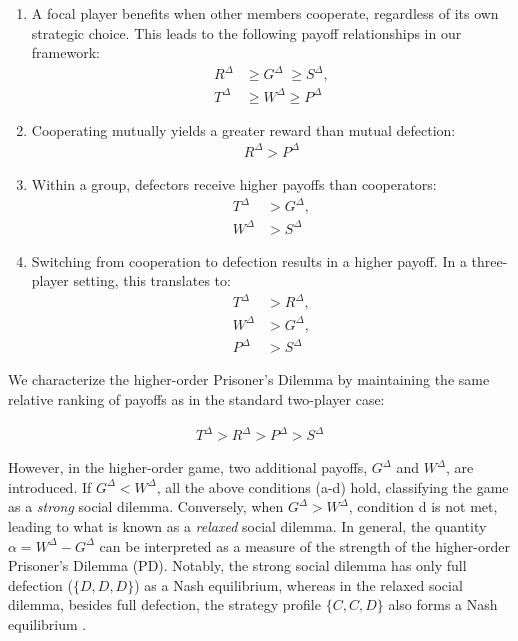 \documentclass[a4paper,pre,reqno,superscriptaddress,twocolumn, floatfix]{revtex4}
\begin{document}
\begin{enumerate}[label=\alph*.]
    \item A focal player benefits when other members cooperate, regardless of its own strategic choice. This leads to the following payoff relationships in our framework:
    \begin{align}
        R^{\Delta} &\geq G^{\Delta} \;\geq S^{\Delta}, \\
        T^{\Delta} &\geq W^{\Delta} \geq P^{\Delta}
    \end{align}
    \item Cooperating mutually yields a greater reward than mutual defection:
    \begin{align}
        R^{\Delta} > P^{\Delta}
    \end{align}
    \item Within a group, defectors receive higher payoffs than cooperators:
    \begin{align}
        T^{\Delta} &> G^{\Delta}, \\
        W^{\Delta} &> S^{\Delta}
    \end{align}
    \item Switching from cooperation to defection results in a higher payoff. In a three-player setting, this translates to:
    \begin{align}
        T^{\Delta} &> R^{\Delta}, \\
        W^{\Delta} &> G^{\Delta}, \\
        P^{\Delta} &> S^{\Delta}
    \end{align}
\end{enumerate}


We characterize the higher-order Prisoner's Dilemma by maintaining the same relative ranking of payoffs as in the standard two-player case:

\begin{align}
    T^{\Delta}>R^{\Delta}>P^{\Delta}>S^{\Delta}
\end{align}

However, in the higher-order game, two additional payoffs, $G^{\Delta}$ and $W^{\Delta}$, are introduced. If $G^{\Delta} < W^{\Delta}$, all the above conditions (a-d) hold, classifying the game as a \textit{strong} social dilemma. Conversely, when $G^{\Delta} > W^{\Delta}$, condition d is not met, leading to what is known as a \textit{relaxed} social dilemma. In general, the quantity $\alpha=W^{\Delta}-G^{\Delta}$ can be interpreted as a measure of the strength of the higher-order Prisoner's Dilemma (PD). Notably, the strong social dilemma has only full defection ($\{D, D, D\}$) as a Nash equilibrium, whereas in the relaxed social dilemma, besides full defection, the strategy profile $\{C, C, D\}$ also forms a Nash equilibrium \cite{gokhale_evolutionary_2010, hilbe_cooperation_2014, civilini_explosive_2024}.
\end{document}
